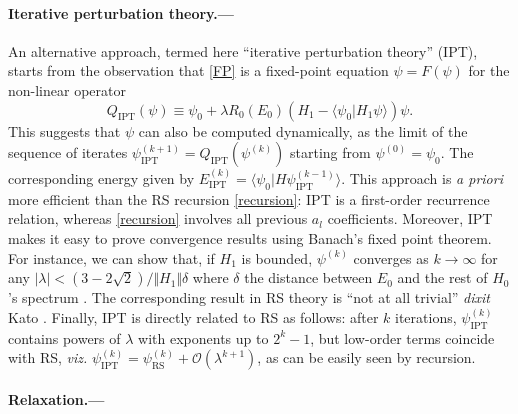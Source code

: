\documentclass[aps,prl,reprint]{revtex4-2}
\begin{document}
    \paragraph{Iterative perturbation theory.---}

    An alternative approach, termed here ``iterative perturbation theory'' (IPT), starts from the observation that \eqref{FP} is a fixed-point equation $\psi = F(\psi)$ for the non-linear operator
    \begin{equation}\label{Fipt}
        Q_\textrm{IPT}(\psi) \equiv \psi_0 +  \lambda R_0(E_0 )( H_1  -\langle \psi_0 \vert H_1 \psi\rangle )\psi.
    \end{equation}
    This suggests that $\psi$ can also be computed dynamically, as the limit of the sequence of iterates $\psi^{(k+1)}_\textrm{IPT} = Q_\textrm{IPT}(\psi^{(k)})$ starting from $\psi^{(0)}=\psi_0$. The corresponding energy given by $E^{(k)}_\textrm{IPT}=\langle \psi_0\vert H\psi^{(k-1)}_\textrm{IPT}\rangle$. This approach is \emph{a priori} more efficient than the RS recursion \eqref{recursion}: IPT is a first-order recurrence relation, whereas \eqref{recursion} involves all previous $a_l$ coefficients.  Moreover, IPT makes it easy to prove convergence results using Banach's fixed point theorem. For instance, we can show that, if $H_1$ is bounded, $\psi^{(k)}$ converges as $k\to\infty$ for any $\vert\lambda\vert < (3 - 2\sqrt{2})/\Vert H_1 \Vert \delta$ where $\delta$ the distance between $E_0 $ and the rest of $H_0 $'s spectrum \cite{kenmoeFastIterativeAlgorithm2021}. The corresponding result in RS theory is ``not at all trivial'' \emph{dixit} Kato \cite{kato2013perturbation}. Finally, IPT is directly related to RS as follows: after $k$ iterations, $\psi^{(k)}_\textrm{IPT}$ contains powers of $\lambda$ with exponents up to $2^k-1$, but low-order terms coincide with RS, \emph{viz.} $\psi^{(k)}_\textrm{IPT} = \psi^{(k)}_\textrm{RS} + \mathcal{O}(\lambda^{k+1})$, as can be easily seen by recursion.

    \paragraph{Relaxation.---}
\end{document}
